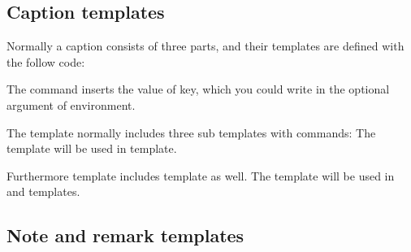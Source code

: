 \documentclass[oneside]{book}
\begin{document}
\begin{codehigh}
\end{codehigh}

\subsection{Caption templates}

Normally a caption consists of three parts, and their templates are defined with the follow code:

\begin{codehigh}
\end{codehigh}

The command  inserts the value of  key,
which you could write in the optional argument of  environment.

The  template normally includes three sub templates with \CC{\UseTblrTemplate} commands:
The  template will be used in  template.

\begin{codehigh}
\end{codehigh}

Furthermore  template includes  template as well.
The  template will be used in  and  templates.

\begin{codehigh}
\end{codehigh}

\subsection{Note and remark templates}
\end{document}
